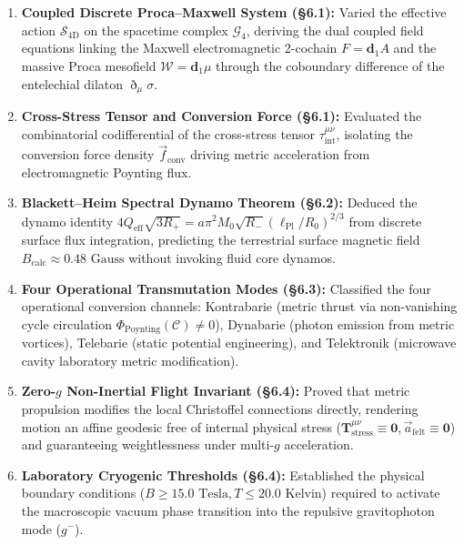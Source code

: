 \documentclass[
    12pt,
    a4paper,
    headings=normal,
    twoside=false,
    open=any,
    parskip=half
]{scrbook}
\newcommand{\ethop}{\eth}
\begin{document}
\begin{tcolorbox}[colback=maincolor!3!white, colframe=maincolor!80!black, title={\textbf{Grand Synthesis of Chapter 6}}]
\begin{enumerate}[leftmargin=1.5em, itemsep=5pt]
    \item \textbf{Coupled Discrete Proca--Maxwell System (§6.1):} Varied the effective action $\mathcal{S}_{4\text{D}}$ on the spacetime complex $\mathcal{G}_4$, deriving the dual coupled field equations linking the Maxwell electromagnetic 2-cochain $F = \mathbf{d}_1 A$ and the massive Proca mesofield $\mathcal{W} = \mathbf{d}_1 \mu$ through the coboundary difference of the entelechial dilaton $\ethop_\mu\sigma$.
    \item \textbf{Cross-Stress Tensor and Conversion Force (§6.1):} Evaluated the combinatorial codifferential of the cross-stress tensor $\tau_{\text{int}}^{\mu\nu}$, isolating the conversion force density $\vec{f}_{\text{conv}}$ driving metric acceleration from electromagnetic Poynting flux.
    \item \textbf{Blackett--Heim Spectral Dynamo Theorem (§6.2):} Deduced the dynamo identity $4 Q_{\text{eff}} \sqrt{3 R_+} = a \pi^2 M_0 \sqrt{R_-} (\ell_{\text{Pl}}/R_0)^{2/3}$ from discrete surface flux integration, predicting the terrestrial surface magnetic field $B_{\text{calc}} \approx 0.48\text{ Gauss}$ without invoking fluid core dynamos.
    \item \textbf{Four Operational Transmutation Modes (§6.3):} Classified the four operational conversion channels: Kontrabarie (metric thrust via non-vanishing cycle circulation $\Phi_{\text{Poynting}}(\mathcal{C}) \ne 0$), Dynabarie (photon emission from metric vortices), Telebarie (static potential engineering), and Telektronik (microwave cavity laboratory metric modification).
    \item \textbf{Zero-$g$ Non-Inertial Flight Invariant (§6.4):} Proved that metric propulsion modifies the local Christoffel connections directly, rendering motion an affine geodesic free of internal physical stress ($\mathbf{T}_{\text{stress}}^{\mu\nu} \equiv \mathbf{0}, \vec{a}_{\text{felt}} \equiv \mathbf{0}$) and guaranteeing weightlessness under multi-$g$ acceleration.
    \item \textbf{Laboratory Cryogenic Thresholds (§6.4):} Established the physical boundary conditions ($B \ge 15.0\text{ Tesla}, T \le 20.0\text{ Kelvin}$) required to activate the macroscopic vacuum phase transition into the repulsive gravitophoton mode ($g^-$).
\end{enumerate}
\end{tcolorbox}
\end{document}
